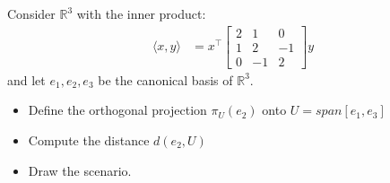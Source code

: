 \documentclass[final,expand]{problemset}
\begin{document}
\problem Consider $\mathbb{R}^3$ with the inner product:
\begin{align*}
	\langle x, y \rangle &= x^\top \begin{bmatrix}
		2 & 1 & 0\\ 1 & 2 & -1\\ 0 & -1 & 2
	\end{bmatrix}y
\end{align*}
and let $e_1, e_2, e_3$ be the canonical basis of $\mathbb{R}^3$. 
\begin{itemize}
	\item Define the orthogonal projection $\pi_U(e_2)$ onto $U = span[e_1, e_3]$
	\item Compute the distance $d(e_2, U)$
	\item Draw the scenario.
\end{itemize}
\end{document}
